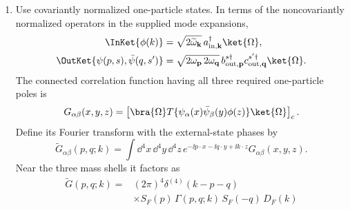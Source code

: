 \begin{enumerate}
\begin{enumerate}
\begin{enumerate}
For completeness, the three Schwinger--Dyson identities can be stated in
a form that covers any time-ordered insertion \(\mathcal X\).  With left
Grassmann differentiation in the second line and right differentiation in
the third,
\[
 \boxed{\begin{aligned}
 \left\langle T\!\left\{
 \bigl[(\Box-M^2)\phi-\lambda\bar\psi\psi\bigr](x)
 \mathcal X\right\}\right\rangle
 &=\ii\left\langle T\frac{\delta\mathcal X}{\delta\phi(x)}
 \right\rangle,\\
 \left\langle T\!\left\{
 \bigl[(\gamma^\mu\partial_\mu+m+\lambda\phi)\psi\bigr](x)
 \mathcal X\right\}\right\rangle
 &=-\ii\left\langle T\frac{\delta\mathcal X}{\delta\bar\psi(x)}
 \right\rangle,\\
 \left\langle T\!\left\{\mathcal X
 \bigl[\bar\psi(\overleftarrow{\partial}_\mu\gamma^\mu
 -m-\lambda\phi)\bigr](x)\right\}\right\rangle
 &=\ii\left\langle T\mathcal X
 \frac{\overleftarrow\delta}{\delta\psi(x)}\right\rangle.
 \end{aligned}}
\]
These equations include all contact terms: differentiating a field inside
\(\mathcal X\) produces its delta function.  For example, the free limits
give \((\Box-M^2)D_F=\ii\delta^{(4)}\) and
\((\gamma^\mu\partial_\mu+m)S_F=-\ii\delta^{(4)}\), consistent with the
volume's propagator phases.
\item
Use covariantly normalized one-particle states.  In terms of the
noncovariantly normalized operators in the supplied mode expansions,
\[
 \begin{aligned}
 \InKet{\phi(k)}
 &=\sqrt{2\widetilde\omega_{\mathbf k}}\,
 a^\dagger_{\mathrm{in},\mathbf k}\ket{\Omega},\\
 \OutKet{\psi(p,s),\bar\psi(q,s')}
 &=\sqrt{2\omega_{\mathbf p}\,2\omega_{\mathbf q}}\,
 b^{s\dagger}_{\mathrm{out},\mathbf p}
 c^{s'\dagger}_{\mathrm{out},\mathbf q}\ket{\Omega}.
 \end{aligned}
\]
The connected correlation function having all three required
one-particle poles is
\[
 G_{\alpha\beta}(x,y,z)
 =\left[\bra{\Omega}T\{\psi_\alpha(x)\bar\psi_\beta(y)\phi(z)\}
 \ket{\Omega}\right]_{c}.
\]
Define its Fourier transform with the external-state phases by
\[
 \widetilde G_{\alpha\beta}(p,q;k)
 =\int \dd^4x\,\dd^4y\,\dd^4z\,
 e^{-\ii p\cdot x-\ii q\cdot y+\ii k\cdot z}
 G_{\alpha\beta}(x,y,z).
\]
Near the three mass shells it factors as
\[
 \begin{aligned}
 \widetilde G(p,q;k)
 ={}&(2\pi)^4\delta^{(4)}(k-p-q)\\
 &\times S_F(p)\,\Gamma(p,q;k)\,S_F(-q)\,D_F(k)

\end{aligned}\]
\end{enumerate}
\end{enumerate}
\end{enumerate}
